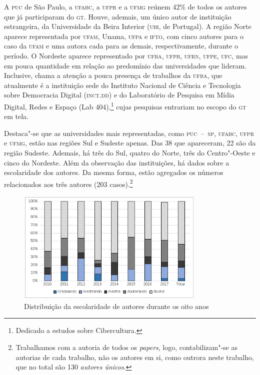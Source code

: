 
A \textsc{puc} de São Paulo, a \textsc{ufabc}, a \textsc{ufpr} e a \textsc{ufmg} reúnem 42\% de todos os
autores que já participaram do \textsc{gt}. Houve, ademais, um único autor de
instituição estrangeira, da Universidade da Beira Interior (\textsc{ubi}, de Portugal). A região Norte aparece representada por \textsc{ufam}, Unama, \textsc{ufpa} e
\textsc{ifto}, com cinco autores para o caso da \textsc{ufam} e uma autora cada para as
demais, respectivamente, durante o período. O Nordeste aparece
representado por \textsc{ufba}, \textsc{ufpb}, \textsc{ufrn}, \textsc{ufpe}, \textsc{ufc}, mas em pouca quantidade em
relação ao predomínio das universidades que lideram. Inclusive, chama a
atenção a pouca presença de trabalhos da \textsc{ufba}, que atualmente é a
instituição sede do Instituto Nacional de Ciência e Tecnologia sobre
Democracia Digital (\textsc{inct}.\textsc{dd}) e do Laboratório de Pesquisa em Mídia
Digital, Redes e Espaço (Lab 404),\footnote{Dedicado a estudos sobre
  Cibercultura.} cujas pesquisas entrariam no escopo do \textsc{gt} em
tela.

Destaca"-se que as universidades mais representadas, como \textsc{puc~--~sp}, \textsc{ufabc}, \textsc{ufpr}
e \textsc{ufmg}, estão nas regiões Sul e Sudeste apenas. Das 38 que apareceram,
22 são da região Sudeste. Ademais, há três do Sul, quatro do Norte, três
do Centro"-Oeste e cinco do Nordeste. Além da observação das
instituições, há dados sobre a escolaridade dos autores. Da mesma
forma, estão agregados os números relacionados aos três autores
(203 casos).\footnote{Trabalhamos com a autoria de todos os
  \textit{papers}, logo, contabilizam"-se as autorias de cada trabalho, não
  os autores em si, como outrora neste trabalho, que no total são 130
  \textit{autores únicos}.}



 \begin{figure}[!ht]
 \centering
  \includegraphics[width=90mm]{./imgs/graf3_3.png}
 \caption{Distribuição da escolaridade de autores durante os oito anos\footnotemark}
 \end{figure}
 
